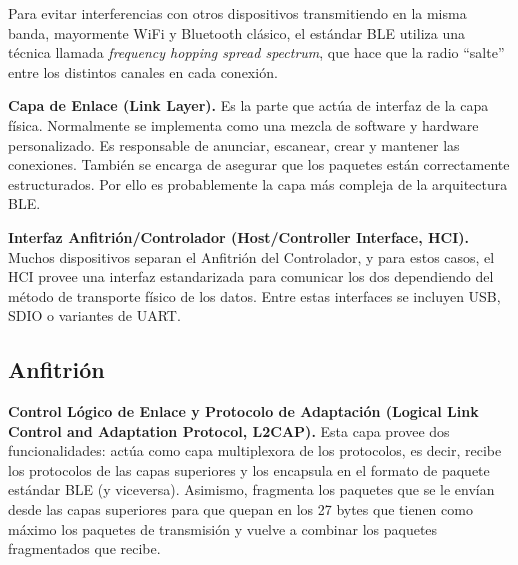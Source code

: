 Para evitar interferencias con otros dispositivos transmitiendo en la misma banda, mayormente WiFi y Bluetooth clásico, el estándar BLE utiliza una técnica llamada \textit{frequency hopping spread spectrum}, que hace que la radio “salte” entre los distintos canales en cada conexión.


\textbf{Capa de Enlace (Link Layer).} Es la parte que actúa de interfaz de la capa física. Normalmente se implementa como una mezcla de software y hardware personalizado. Es responsable de anunciar, escanear, crear y mantener las conexiones. También se encarga de asegurar que los paquetes están correctamente estructurados. Por ello es probablemente la capa más compleja de la arquitectura BLE.


\textbf{Interfaz Anfitrión/Controlador (Host/Controller Interface, HCI).} Muchos dispositivos separan el Anfitrión del Controlador, y para estos casos, el HCI provee una interfaz estandarizada para comunicar los dos dependiendo del método de transporte físico de los datos. Entre estas interfaces se incluyen USB, SDIO o variantes de UART.

\subsection{Anfitrión}
\label{makereference2.2.2}

\textbf{Control Lógico de Enlace y Protocolo de Adaptación (Logical Link Control and Adaptation Protocol, L2CAP).} Esta capa provee dos funcionalidades: actúa como capa multiplexora de los protocolos, es decir, recibe los protocolos de las capas superiores y los encapsula en el formato de paquete estándar BLE (y viceversa). Asimismo, fragmenta los paquetes que se le envían desde las capas superiores para que quepan en los 27 bytes que tienen como máximo los paquetes de transmisión y vuelve a combinar los paquetes fragmentados que recibe.



